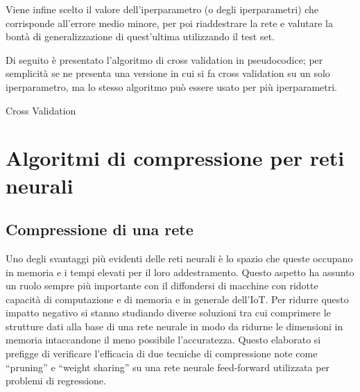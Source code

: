 \documentclass[12pt]{report}
\begin{document}
Viene infine scelto il valore dell'iperparametro (o degli iperparametri) che corrisponde all'errore medio minore, per poi riaddestrare la rete e valutare la bontà di generalizzazione di quest'ultima utilizzando il test set.

Di seguito è presentato l'algoritmo di cross validation in pseudocodice; per semplicità se ne presenta una versione in cui si fa cross validation su un solo iperparametro, ma lo stesso algoritmo può essere usato per più iperparametri.

\makeatletter
\def\BState{\State\hskip-\ALG@thistlm}
\makeatother
\begin{algorithm}
\caption{Cross Validation}
\end{algorithm}

\chapter{Algoritmi di compressione per reti neurali}

\section{Compressione di una rete}

Uno degli svantaggi più evidenti delle reti neurali è lo spazio che queste occupano in memoria e i tempi elevati per il loro addestramento. Questo aspetto ha assunto un ruolo sempre più importante con il diffondersi di macchine con ridotte capacità di computazione e di memoria e in generale dell’IoT. 
Per ridurre questo impatto negativo si stanno studiando diverse soluzioni tra cui comprimere le strutture dati alla base di una rete neurale in modo da ridurne le dimensioni in memoria intaccandone il meno possibile l'accuratezza. Questo elaborato si prefigge di verificare l'efficacia di due tecniche di compressione note come ``pruning'' e ``weight sharing'' su una rete neurale feed-forward utilizzata per problemi di regressione.
\end{document}
